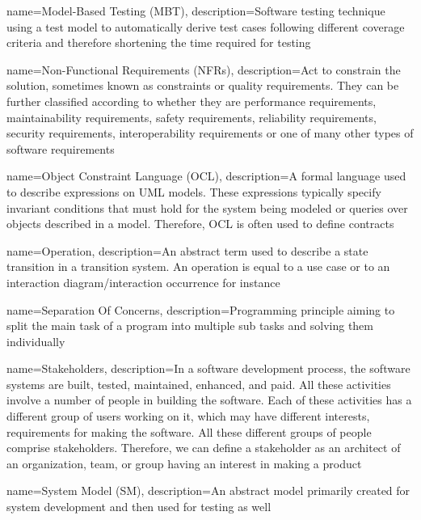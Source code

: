 {
	name={Model-Based Testing (MBT)},
	description={Software testing technique using a test model to automatically derive test cases following different coverage criteria and therefore shortening the time required for testing \cite{Paper1}}
}

{
	name={Non-Functional Requirements (NFRs)},
	description={Act to constrain the solution, sometimes known as constraints or quality requirements. They can be further classified according to whether they are performance requirements, maintainability requirements, safety requirements, reliability requirements, security requirements, interoperability requirements or one of many other types of software requirements \cite{SWEBOK}}
}

{
	name={Object Constraint Language (OCL)},
	description={A formal language used to describe expressions on UML models. These expressions typically specify invariant conditions that must hold for the system being modeled or queries over objects described in a model. Therefore, OCL is often used to define contracts \cite{OCL}}
}

{
	name={Operation},
	description={An abstract term used to describe a state transition in a transition system. An operation is equal to a use case or to an interaction diagram/interaction occurrence for instance \cite{ClementineNebut2006, NajlaRaza2007}}
}

{
	name={Separation Of Concerns},
	description={Programming principle aiming to split the main task of a program into multiple sub tasks and solving them individually \cite{Metsa}}
}

{
	name={Stakeholders},
	description={In a software development process, the software systems are built, tested, maintained, enhanced, and paid. All these activities involve a number of people in building the software. Each of these activities has a different group of users working on it, which may have different interests, requirements for making the software. All these different groups of people comprise stakeholders. Therefore, we can define a stakeholder as an architect of an organization, team, or group having an interest in making a product \cite{Stakeholders}}
}

{
	name={System Model (SM)},
	description={An abstract model primarily created for system development and then used for testing as well \cite{Paper1}}
}

